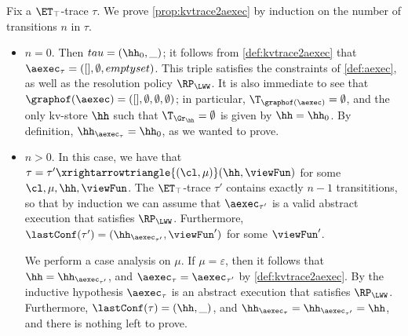 Fix a $\ET_{\top}$-trace $\tau$. We prove \cref{prop:kvtrace2aexec} by induction 
on the number of transitions $n$ in $\tau$. 
\begin{itemize}
\item $n = 0$. Then $tau = (\hh_{0}, \_)$; it follows from \cref{def:kvtrace2aexec} that 
$\aexec_{\tau} = ([], \emptyset, emptyset)$. This triple satisfies the constraints 
of \cref{def:aexec}, as well as the resolution policy $\RP_{\LWW}$. 
It is also immediate to see that $\graphof(\aexec) = ([], \emptyset, \emptyset, \emptyset)$; in particular, 
$\T_{\graphof(\aexec)} = \emptyset$, and the only kv-store $\hh$ such that $\T_{\Gr_{\hh}} = \emptyset$ 
is given by $\hh = \hh_{0}$. By definition, $\hh_{\aexec_{\tau}} = \hh_{0}$, as we wanted to prove.

\item $n > 0$. In this case, we have that $\tau = \tau' \xrightarrowtriangle{(\cl, \mu)} (\hh, \viewFun)$ 
for some $\cl, \mu, \hh, \viewFun$. The $\ET_{\top}$-trace $\tau'$ contains exactly $n-1$ transititions, 
so that by induction we can assume that $\aexec_{\tau'}$ is a valid abstract execution that satisfies 
$\RP_{\LWW}$. Furthermore, $\lastConf(\tau') = (\hh_{\aexec_{\tau'}}, \viewFun')$ for some $\viewFun'$. 

We perform a case analysis on $\mu$. If $\mu = \varepsilon$, then it follows that $\hh = \hh_{\aexec_{\tau'}}$, 
and $\aexec_{\tau} = \aexec_{\tau'}$ by \cref{def:kvtrace2aexec}. By the inductive hypothesis 
$\aexec_{\tau}$ is an abstract execution that satisfies $\RP_{\LWW}$. Furthermore, 
$\lastConf(\tau) = (\hh, \_)$, and $\hh_{\aexec_{\tau}} = \hh_{\aexec_{\tau'}} = \hh$, 
and there is nothing left to prove. 


\end{itemize}
